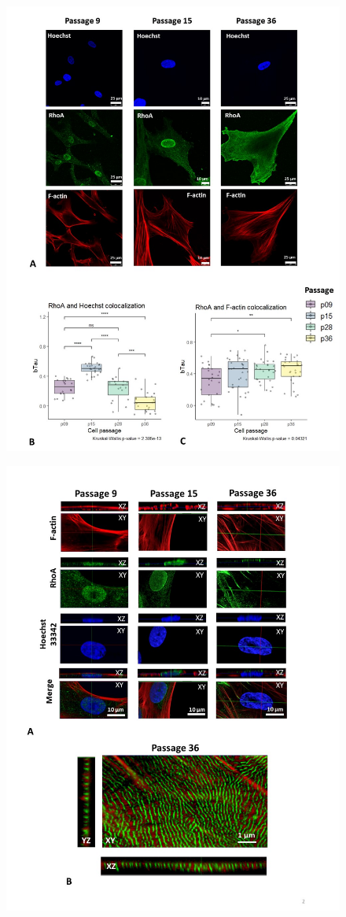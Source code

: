 \documentclass[alpha-refs]{wiley-article}
\begin{document}
\begin{figure}[hbt!]
  \includegraphics[width=0.9\linewidth]{rho.jpg}
  \caption{}
  \centering
\end{figure}

\begin{figure}[hbt!]
  \includegraphics[width=0.9\linewidth]{rho-3d.jpg}
  \caption{}
  \centering
\end{figure}
\end{document}
